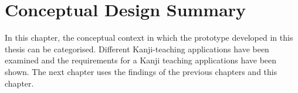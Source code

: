 
\section{Conceptual Design Summary}
\label{sec:concep:design}

In this chapter, the conceptual context in which the prototype developed 
in this thesis can be categorised.
Different Kanji-teaching applications have been examined and the requirements 
for a Kanji teaching applications have been shown.
The next chapter uses the findings of the previous chapters and this chapter.